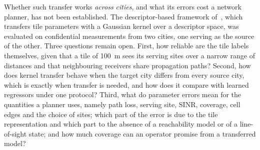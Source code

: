 Whether such transfer works \emph{across cities}, and what its errors cost a
network planner, has not been established. The descriptor-based framework
of~\cite{ozyurt2026}, which transfers tile parameters with a Gaussian kernel
over a descriptor space, was evaluated on confidential measurements from two
cities, one serving as the source of the other. Three questions remain open.
First, how reliable are the tile labels themselves, given that a tile of
\SI{100}{\metre} sees its serving sites over a narrow range of distances and
that neighbouring receivers share propagation paths? Second, how does kernel
transfer behave when the target city differs from every source city, which
is exactly when transfer is needed, and how does it compare with learned
regressors under one protocol? Third, what do parameter errors mean for the
quantities a planner uses, namely path loss, serving site, SINR, coverage,
cell edges and the choice of sites; which part of the error is due to the
tile representation and which part to the absence of a reachability model
or of a line-of-sight state; and how much coverage can an operator promise
from a transferred model?

